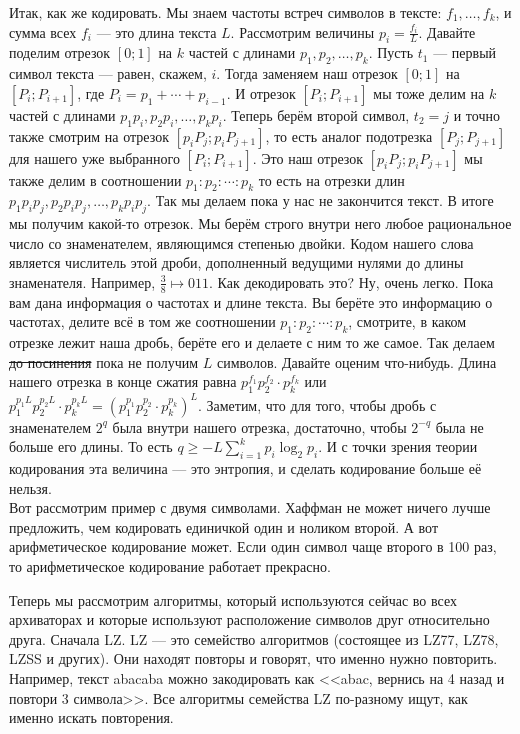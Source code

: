\documentclass{article}
\begin{document}
\begin{itemize}
\begin{Comment}
            Итак, как же кодировать. Мы знаем частоты встреч символов в тексте: $f_1,\ldots,f_k$, и сумма всех $f_i$ --- это длина текста $L$. Рассмотрим величины $p_i=\frac{f_i}L$. Давайте поделим отрезок $[0;1]$ на $k$ частей с длинами $p_1,p_2,\ldots,p_k$. Пусть $t_1$ --- первый символ текста --- равен, скажем, $i$. Тогда заменяем наш отрезок $[0;1]$ на $[P_i;P_{i+1}]$, где $P_i=p_1+\cdots+p_{i-1}$. И отрезок $[P_i;P_{i+1}]$ мы тоже делим на $k$ частей с длинами $p_1p_i,p_2p_i,\ldots,p_kp_i$. Теперь берём второй символ, $t_2=j$ и точно также смотрим на отрезок $[p_iP_j;p_iP_{j+1}]$, то есть аналог подотрезка $[P_j;P_{j+1}]$ для нашего уже выбранного $[P_i;P_{i+1}]$. Это наш отрезок $[p_iP_j;p_iP_{j+1}]$ мы также делим в соотношении $p_1:p_2:\cdots:p_k$ то есть на отрезки длин $p_1p_ip_j,p_2p_ip_j,\ldots,p_kp_ip_j$. Так мы делаем пока у нас не закончится текст. В итоге мы получим какой-то отрезок. Мы берём строго внутри него любое рациональное число со знаменателем, являющимся степенью двойки. Кодом нашего слова является числитель этой дроби, дополненный ведущими нулями до длины знаменателя. Например, $\frac38\mapsto011$. Как декодировать это? Ну, очень легко. Пока вам дана информация о частотах и длине текста. Вы берёте это информацию о частотах, делите всё в том же соотношении $p_1:p_2:\cdots:p_k$, смотрите, в каком отрезке лежит наша дробь, берёте его и делаете с ним то же самое. Так делаем \sout{до посинения} пока не получим $L$ символов. Давайте оценим что-нибудь. Длина нашего отрезка в конце сжатия равна $p_1^{f_1}p_2^{f_2}\cdot p_k^{f_k}$ или $p_1^{p_1L}p_2^{p_2L}\cdot p_k^{p_kL}=\left(p_1^{p_1}p_2^{p_2}\cdot p_k^{p_k}\right)^L$. Заметим, что для того, чтобы дробь с знаменателем $2^q$ была внутри нашего отрезка, достаточно, чтобы $2^{-q}$ была не больше его длины. То есть $q\geqslant-L\sum_{i=1}^kp_i\log_2p_i$. И с точки зрения теории кодирования эта величина --- это энтропия, и сделать кодирование больше её нельзя.\\
            Вот рассмотрим пример с двумя символами. Хаффман не может ничего лучше предложить, чем кодировать единичкой один и ноликом второй. А вот арифметическое кодирование может. Если один символ чаще второго в 100 раз, то арифметическое кодирование работает прекрасно.
        \end{Comment}
        \begin{Comment}
            Теперь мы рассмотрим алгоритмы, который используются сейчас во всех архиваторах и которые используют расположение символов друг относительно друга. Сначала LZ. LZ --- это семейство алгоритмов (состоящее из LZ77, LZ78, LZSS и других). Они находят повторы и говорят, что именно нужно повторить. Например, текст abacaba можно закодировать как <<abac, вернись на 4 назад и повтори 3 символа>>. Все алгоритмы семейства LZ по-разному ищут, как именно искать повторения.\\

\end{Comment}
\end{itemize}
\end{document}
